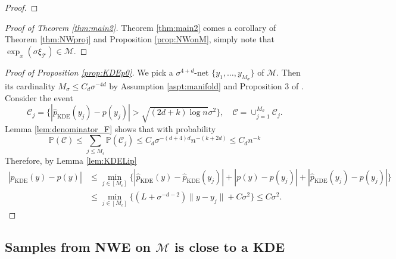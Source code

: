 \documentclass{article}
\def\Prob{{\mathbb P}}
\def\calM{\mathcal{M}}
\begin{document}
\begin{proof}

\end{proof}

\begin{proof}[Proof of Theorem \ref{thm:main2}]
Theorem \ref{thm:main2} comes a corollary of Theorem \ref{thm:NWproj} and Proposition \ref{prop:NWonM}, simply note that $\exp_x(\sigma \xi_{\mathcal{T}})\in\calM$.  
\end{proof}

\begin{proof}[Proof of Proposition \ref{prop:KDEp0}]
We pick a $\sigma^{4+d}$-net $\{y_1,\ldots, y_{M_\sigma}\}$ of $\calM$. Then its cardinality $M_{\sigma}\leq C_d\sigma^{-4d}$ by Assumption \ref{aspt:manifold} and Proposition 3 of \cite{azangulov2024convergence}.
Consider the event
\[
\mathcal{C}_j=\{|\widehat{p}_{\text{KDE}}(y_j)-p(y_j)|>\sqrt{(2d+k)\log n}\sigma^2\},\quad \mathcal{C}=\cup_{j=1}^{M_\sigma} \mathcal{C}_j.
\]
Lemma \ref{lem:denominator_F} shows that with probability $$\Prob(\mathcal{C})\leq 
\sum_{j\leq M_\epsilon}\Prob(\mathcal{C}_j)\leq C_d\sigma^{-(d+4)d} n^{-(k+2d)}\leq C_dn^{-k}$$
Therefore, by Lemma \ref{lem:KDELip}
\begin{align*}
|\widehat{p}_{\text{KDE}}(y)-p(y)|&\leq \min_{j\in [M_\epsilon]}\{|\widehat{p}_{\text{KDE}}(y)-\widehat{p}_{\text{KDE}}(y_j)|+|p(y)-p(y_j)|+|\widehat{p}_{\text{KDE}}(y_j)-p(y_j)|\}\\
&\leq \min_{j\in [M_\epsilon]}\{ (L+\sigma^{-d-2})\|y-y_j\|+C\sigma^2\}\leq C\sigma^2. 
\end{align*}
\end{proof}



\subsection{Samples from NWE on $\calM$ is close to a KDE}
\label{sec:KDEproof}
\end{document}
